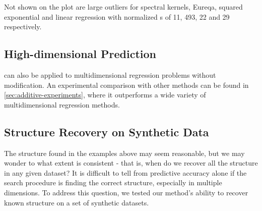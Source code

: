 Not shown on the plot are large outliers for spectral kernels, Eureqa, squared exponential and linear regression with normalized \RMSE{}s of 11, 493, 22 and 29 respectively.







\subsection{High-dimensional Prediction}

\procedurename{} can also be applied to multidimensional regression problems without modification.
An experimental comparison with other methods can be found in \cref{sec:additive-experiments}, where it outperforms a wide variety of multidimensional regression methods.



\subsection{Structure Recovery on Synthetic Data}
\label{sec:synthetic}

The structure found in the examples above may seem reasonable, but we may wonder to what extent \procedurename{} is consistent - that is, when do we recover all the structure in any given dataset?
It is difficult to tell from predictive accuracy alone if the search procedure is finding the correct structure, especially in multiple dimensions.
To address this question, we tested our method's ability to recover known structure on a set of synthetic datasets.

